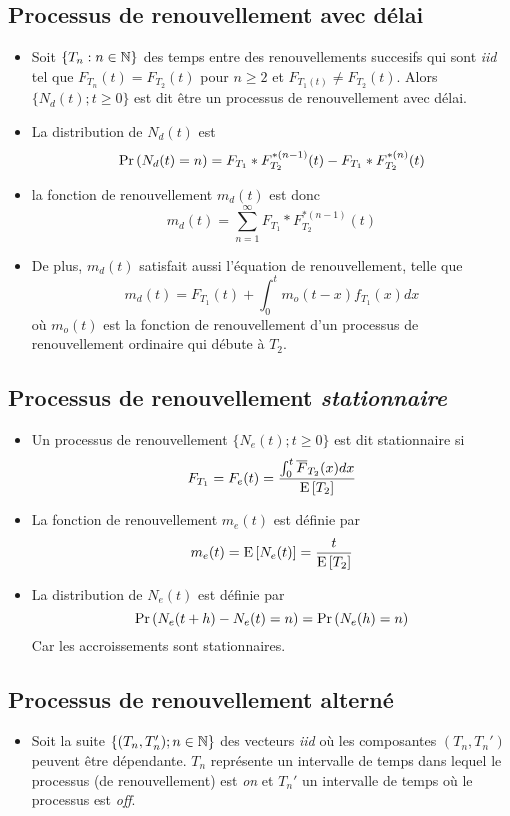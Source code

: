 \documentclass[10pt, french, landscape]{article}
\begin{document}
\begin{multicols*}{3}
\subsection*{Processus de renouvellement avec délai}
\begin{itemize}
\item Soit $\{ T_n : n \in \mathbb{N} \}$ des temps entre des renouvellements succesifs qui sont \emph{iid} tel que $F_{T_n}(t) = F_{T_2}(t)$ pour $n \geq 2$ et $F_{T_1(t)} \neq F_{T_2}(t)$. Alors $\{N_d(t) ; t \geq 0 \}$ est dit être un processus de renouvellement avec délai. 

\item La distribution de $N_d(t)$ est
\[\Pr \left( N_d(t) = n \right) = F_{T_1} \ast F_{T_2}^{\ast(n-1)}(t) - F_{T_1} \ast F_{T_2}^{\ast (n)}(t)  \]

\item la fonction de renouvellement $m_d(t)$ est donc
\[m_d(t) = \sum_{n=1}^{\infty} F_{T_1} \ast F_{T_2}^{\ast (n-1)}(t)  \]

\item De plus, $m_d(t)$ satisfait aussi l'équation de renouvellement, telle que
\[m_d(t) = F_{T_1}(t) + \int_{0}^{t}  m_o(t-x) f_{T_1}(x) dx \]
où $m_o(t)$ est la fonction de renouvellement d'un processus de renouvellement ordinaire qui débute à $T_2$.
\end{itemize}

\subsection*{Processus de renouvellement \emph{stationnaire}}
\begin{itemize}
\item Un processus de renouvellement $\{ N_e(t) ; t \geq 0 \}$ est dit stationnaire si
\[F_{T_1} = F_e(t) = \frac{\int_{0}^{t} \overline{F}_{T_2}(x) dx  }{\mathrm{E} \left[ T_2 \right]}\]

\item La fonction de renouvellement $m_e(t)$ est définie par
\[m_e(t) = \mathrm{E} \left[ N_e(t) \right] = \frac{t}{\mathrm{E} \left[ T_2 \right]} \]

\item La distribution de $N_e(t)$ est définie par
\[\Pr \left( N_e(t+h) - N_e(t) = n \right) = \Pr \left( N_e(h) = n \right)\]
Car les accroissements sont stationnaires.
\end{itemize}

\subsection*{Processus de renouvellement alterné}
\begin{itemize}
\item Soit la suite $\{ (T_n, T_n') ; n \in \mathbb{N} \}$ des vecteurs \emph{iid} où les composantes $(T_n, T_n')$ peuvent être dépendante. $T_n$ représente un intervalle de temps dans lequel le processus (de renouvellement) est \emph{on} et $T_n'$ un intervalle de temps où le processus est \emph{off}.


\end{itemize}
\end{multicols*}
\end{document}
